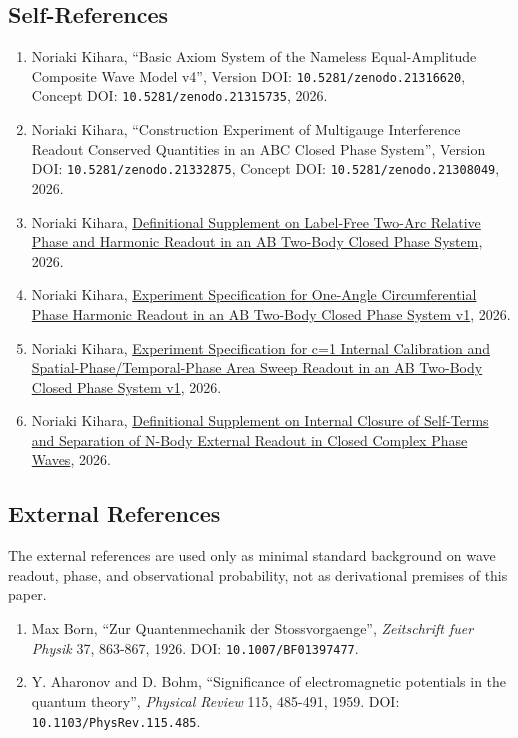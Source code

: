 \documentclass[
]{article}
\providecommand{\tightlist}{%
  \setlength{\itemsep}{0pt}\setlength{\parskip}{0pt}}
\begin{document}
\subsection{Self-References}\label{self-references}

\begin{enumerate}
\def\labelenumi{\arabic{enumi}.}
\tightlist
\item
  Noriaki Kihara, ``Basic Axiom System of the Nameless Equal-Amplitude
  Composite Wave Model v4'', Version DOI:
  \texttt{10.5281/zenodo.21316620}, Concept DOI:
  \texttt{10.5281/zenodo.21315735}, 2026.
\item
  Noriaki Kihara, ``Construction Experiment of Multigauge Interference
  Readout Conserved Quantities in an ABC Closed Phase System'', Version
  DOI: \texttt{10.5281/zenodo.21332875}, Concept DOI:
  \texttt{10.5281/zenodo.21308049}, 2026.
\item
  Noriaki Kihara,
  \href{AB二体閉鎖位相系におけるラベルなし二弧相対位相と調和読出しに関する定義補足.md}{Definitional
  Supplement on Label-Free Two-Arc Relative Phase and Harmonic Readout
  in an AB Two-Body Closed Phase System}, 2026.
\item
  Noriaki Kihara,
  \href{AB二体閉鎖位相系における一角度円周位相調和読出し実験仕様書\%20v1.md}{Experiment
  Specification for One-Angle Circumferential Phase Harmonic Readout in
  an AB Two-Body Closed Phase System v1}, 2026.
\item
  Noriaki Kihara,
  \href{AB二体閉鎖位相系におけるc=1内部較正と空間位相・時間位相面積スイープ読出し実験仕様書\%20v1.md}{Experiment
  Specification for c=1 Internal Calibration and
  Spatial-Phase/Temporal-Phase Area Sweep Readout in an AB Two-Body
  Closed Phase System v1}, 2026.
\item
  Noriaki Kihara,
  \href{閉鎖複素位相波における自己項の内部閉鎖とN体外部読出し分離に関する定義補足.md}{Definitional
  Supplement on Internal Closure of Self-Terms and Separation of N-Body
  External Readout in Closed Complex Phase Waves}, 2026.
\end{enumerate}

\subsection{External References}\label{external-references}

The external references are used only as minimal standard background on
wave readout, phase, and observational probability, not as derivational
premises of this paper.

\begin{enumerate}
\def\labelenumi{\arabic{enumi}.}
\setcounter{enumi}{6}
\tightlist
\item
  Max Born, ``Zur Quantenmechanik der Stossvorgaenge'',
  \emph{Zeitschrift fuer Physik} 37, 863-867, 1926. DOI:
  \texttt{10.1007/BF01397477}.
\item
  Y. Aharonov and D. Bohm, ``Significance of electromagnetic potentials
  in the quantum theory'', \emph{Physical Review} 115, 485-491, 1959.
  DOI: \texttt{10.1103/PhysRev.115.485}.
\end{enumerate}
\end{document}
